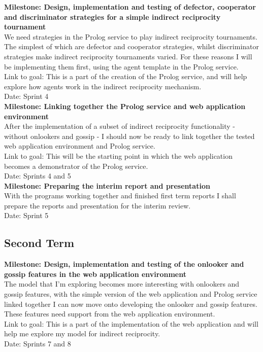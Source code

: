 \documentclass{article}
\begin{document}
\noindent\textbf{Milestone: Design, implementation and testing of defector, cooperator and discriminator strategies for a simple indirect reciprocity tournament}\\
We need strategies in the Prolog service to play indirect reciprocity tournaments. The simplest of which are defector and cooperator strategies, whilst discriminator strategies make indirect reciprocity tournaments varied. For these reasons I will be implementing them first, using the agent template in the Prolog service.\\
Link to goal: This is a part of the creation of the Prolog service, and will help explore how agents work in the indirect reciprocity mechanism.\\
Date: Sprint 4\\

\noindent\textbf{Milestone: Linking together the Prolog service and web application environment}\\
After the implementation of a subset of indirect reciprocity functionality - without onlookers and gossip - I should now be ready to link together the tested web application environment and Prolog service.\\
Link to goal: This will be the starting point in which the web application becomes a demonstrator of the Prolog service.\\
Date: Sprints 4 and 5\\

\noindent\textbf{Milestone: Preparing the interim report and presentation}\\
With the programs working together and finished first term reports I shall prepare the reports and presentation for the interim review.\\
Date: Sprint 5\\

\subsection*{Second Term}

\noindent\textbf{Milestone: Design, implementation and testing of the onlooker and gossip features in the web application environment}\\
The model that I'm exploring becomes more interesting with onlookers and gossip features, with the simple version of the web application and Prolog service linked together I can now move onto developing the onlooker and gossip features. These features need support from the web application environment.\\
Link to goal: This is a part of the implementation of the web application and will help me explore my model for indirect reciprocity.\\
Date: Sprints 7 and 8\\
\end{document}
